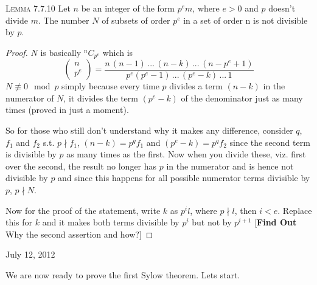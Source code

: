 \documentclass[12pt]{article}
\begin{document}
\textsc {Lemma 7.7.10} Let $n$ be an integer of the form $p^{e}m$, where $e>0$ and $p$ doesn't divide $m$. The number $N$ of subsets of order $p^{e}$ in a set of order n is not divisible by $p$.
\begin{proof}
$N$ is basically $^{n}C_{p^{e}}$ which is \\
\begin{equation*}
\left( \begin{array}{c}
n\\
p^{e} \end{array} \right) = \frac{n \, (n-1) \, ... \, (n-k) \, ... \, (n-p^{e}+1)}{p^{e}(p^{e}-1)\, ... \, (p^{e}-k)\, ... \, 1 }
\end{equation*}
$N \not \equiv 0 \mod{p}$ simply because every time $p$ divides a term $(n-k)$ in the numerator of $N$, it divides the term $(p^{e}-k)$ of the denominator just as many times (proved in just a moment).
\par
So for those who still don't understand why it makes any difference, consider $q$, $f_{1}$ and $f_{2}$ s.t. $p \nmid f_{1}$, $(n-k)=p^{q}f_{1}$ and $(p^{e}-k)=p^{q}f_{2}$ since the second term is divisible by $p$ as many times as the first. Now when you divide these, viz. first over the second, the result no longer has $p$ in the numerator and is hence not divisible by $p$ and since this happens for all possible numerator terms divisible by $p$, $p \nmid N$.
\par
Now for the proof of the statement, write $k$ as $p^{i}l$, where $p \nmid l$, then $i<e$. Replace this for $k$ and it makes both terms divisible by $p^{i}$ but not by $p^{i+1}$ [{\bf Find Out } Why the second assertion and how?]
\end{proof}
\begin{flushright} {\small July 12, 2012} \end{flushright}
We are now ready to prove the first Sylow theorem. Lets start.
\end{document}
